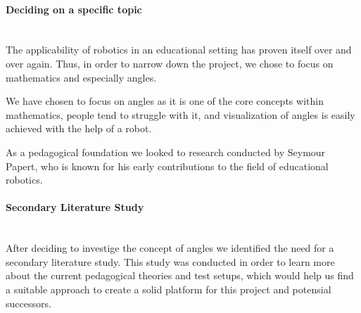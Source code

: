 \paragraph{Deciding on a specific topic}\label{sec:decideTopic}~\\
The applicability of robotics in an educational setting has proven itself over and over again. Thus, in order to narrow down the project, we chose to focus on mathematics and especially angles. 

\bigskip\noindent
We have chosen to focus on angles as it is one of the core concepts within mathematics, people tend to struggle with it, and visualization of angles is easily achieved with the help of a robot. %

\bigskip\noindent
As a pedagogical foundation we looked to research conducted by Seymour Papert, who is known for his early contributions to the field of educational robotics.

\paragraph{Secondary Literature Study}~\\
After deciding to investige the concept of angles we identified the need for a secondary literature study. 
This study was conducted in order to learn more about the current pedagogical theories and test setups, which would help us find a suitable approach to create a solid platform for this project and potensial successors.

